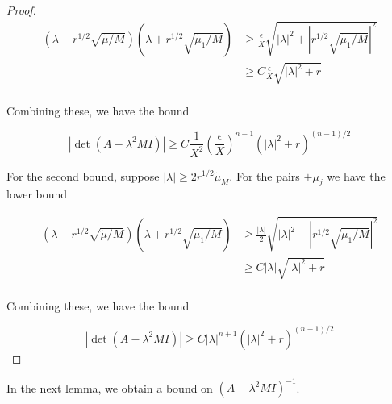 \documentclass[thesis.tex]{subfiles}
\begin{document}
\begin{lemma}
\begin{proof}
\begin{align*}
(\lambda - r^{1/2} \sqrt{\tilde{\mu}/M} )(\lambda + r^{1/2} \sqrt{\tilde{\mu}_1/M} )
&\geq \frac{\epsilon}{X} \sqrt{ |\lambda|^2 + |r^{1/2} \sqrt{\tilde{\mu}_1/M}|^2 } \\
&\geq C \frac{\epsilon}{X} \sqrt{ |\lambda|^2 + r } \\
\end{align*}

Combining these, we have the bound

\[
|\det(A - \lambda^2 M I)|
\geq C \frac{1}{X^2} \left( \frac{\epsilon}{X} \right)^{n-1} \left( |\lambda|^2 + r \right)^{(n-1)/2}
\]

For the second bound, suppose $|\lambda| \geq 2 r^{1/2} \tilde{\mu}_M$. For the pairs $\pm \mu_j$ we have the lower bound

\begin{align*}
(\lambda - r^{1/2} \sqrt{\tilde{\mu}/M} )(\lambda + r^{1/2} \sqrt{\tilde{\mu}_1/M} )
&\geq \frac{|\lambda|}{2} \sqrt{ |\lambda|^2 + |r^{1/2} \sqrt{\tilde{\mu}_1/M}|^2 } \\
&\geq C |\lambda| \sqrt{ |\lambda|^2 + r } \\
\end{align*}

Combining these, we have the bound

\[
|\det(A - \lambda^2 M I)|
\geq C |\lambda|^{n+1} \left( |\lambda|^2 + r \right)^{(n-1)/2}
\]

\end{proof}
\end{lemma}

In the next lemma, we obtain a bound on $(A - \lambda^2 M I)^{-1}$.

\end{document}
